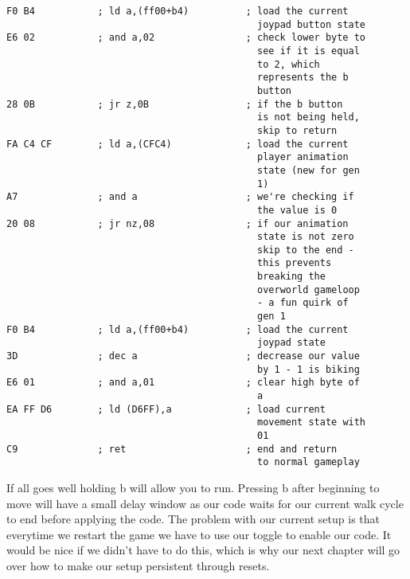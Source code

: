 \documentclass[../main.tex]{subfiles}
\begin{document}
    \begin{verbatim}
F0 B4           ; ld a,(ff00+b4)          ; load the current
                                            joypad button state
E6 02           ; and a,02                ; check lower byte to
                                            see if it is equal
                                            to 2, which
                                            represents the b
                                            button
28 0B           ; jr z,0B                 ; if the b button
                                            is not being held,
                                            skip to return
FA C4 CF        ; ld a,(CFC4)             ; load the current
                                            player animation
                                            state (new for gen
                                            1)
A7              ; and a                   ; we're checking if 
                                            the value is 0
20 08           ; jr nz,08                ; if our animation
                                            state is not zero
                                            skip to the end -
                                            this prevents
                                            breaking the
                                            overworld gameloop
                                            - a fun quirk of
                                            gen 1
F0 B4           ; ld a,(ff00+b4)          ; load the current
                                            joypad state
3D              ; dec a                   ; decrease our value
                                            by 1 - 1 is biking
E6 01           ; and a,01                ; clear high byte of
                                            a
EA FF D6        ; ld (D6FF),a             ; load current
                                            movement state with
                                            01
C9              ; ret                     ; end and return
                                            to normal gameplay
    \end{verbatim}

    If all goes well holding b will allow you to run.  Pressing b after beginning to move will have a small delay window as our code waits for our current walk cycle to end before applying the code.  The problem with our current setup is that everytime we restart the game we have to use our toggle to enable our code.  It would be nice if we didn't have to do this, which is why our next chapter will go over how to make our setup persistent through resets.
\end{document}
